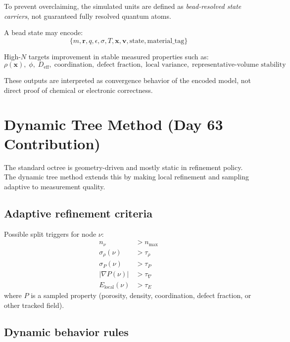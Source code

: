 \documentclass[11pt, a4paper, oneside]{article}
\begin{document}
To prevent overclaiming, the simulated units are defined as \emph{bead-resolved state carriers}, not guaranteed fully resolved quantum atoms.

A bead state may encode:
\begin{equation}
\{m,\mathbf{r},q,\epsilon,\sigma,T,\mathbf{x},\mathbf{v},\text{state},\text{material\_tag}\}
\end{equation}

High-$N$ targets improvement in stable measured properties such as:
\begin{equation}
\rho(\mathbf{x}),\; \phi,\; D_{\mathrm{eff}},\; \text{coordination},\; \text{defect fraction},\; \text{local variance},\; \text{representative-volume stability}
\end{equation}

These outputs are interpreted as convergence behavior of the encoded model, not direct proof of chemical or electronic correctness.

\section{Dynamic Tree Method (Day 63 Contribution)}

The standard octree is geometry-driven and mostly static in refinement policy.
The dynamic tree method extends this by making local refinement and sampling adaptive to measurement quality.

\subsection{Adaptive refinement criteria}

Possible split triggers for node $\nu$:
\begin{align}
 n_{\nu} &> n_{\max} \\
 \sigma_{\rho}(\nu) &> \tau_{\rho} \\
 \sigma_{P}(\nu) &> \tau_{P} \\
 \lvert \nabla P(\nu) \rvert &> \tau_{\nabla} \\
 E_{\mathrm{local}}(\nu) &> \tau_{E}
\end{align}
where $P$ is a sampled property (porosity, density, coordination, defect fraction, or other tracked field).

\subsection{Dynamic behavior rules}
\end{document}
